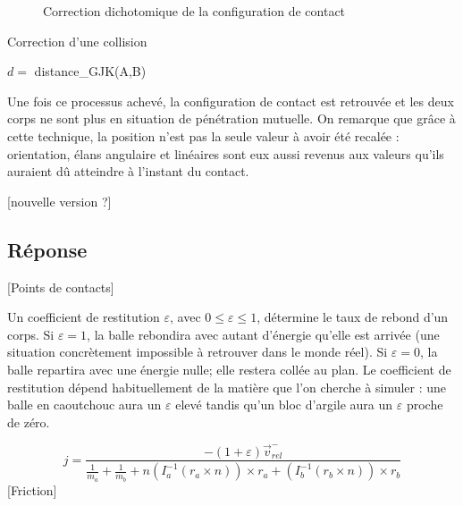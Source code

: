\begin{figure}
  \centering
  
  \caption{Correction dichotomique de la configuration de contact}
  \label{dichotomie}
\end{figure}

\begin{algorithm}
  \caption{Correction d'une collision}
  \label{algoDichotomie}
  \dontprintsemicolon
  \BlankLine
  $d =$ distance\_GJK(A,B)\;
\end{algorithm}

Une fois ce processus achevé, la configuration de contact est
retrouvée et les deux corps ne sont plus en situation de pénétration
mutuelle. On remarque que grâce à cette technique, la position n'est
pas la seule valeur à avoir été recalée : orientation, élans angulaire
et linéaires sont eux aussi revenus aux valeurs qu'ils auraient dû
atteindre à l'instant du contact.

[nouvelle version ?]

\subsection{Réponse}

[Points de contacts]

Un coefficient de restitution $\varepsilon$, avec $0 \leq \varepsilon
\leq 1$, détermine le taux de rebond d'un corps. Si $\varepsilon = 1$,
la balle rebondira avec autant d'énergie qu'elle est arrivée (une
situation concrètement impossible à retrouver dans le monde réel). Si
$\varepsilon = 0$, la balle repartira avec une énergie nulle; elle
restera collée au plan. Le coefficient de restitution dépend
habituellement de la matière que l'on cherche à simuler : une balle en
caoutchouc aura un $\varepsilon$ elevé tandis qu'un bloc d'argile aura
un $\varepsilon$ proche de zéro.

\[
j = \frac{-(1 + \varepsilon) \vec{v}_{rel}^-}{
  \frac{1}{m_a} +
  \frac{1}{m_b} +
  n
  (I_a^{-1} (r_a \times n)) \times r_a +
  (I_b^{-1} (r_b \times n)) \times r_b
}
\]
[Friction]

\cite{newton}


